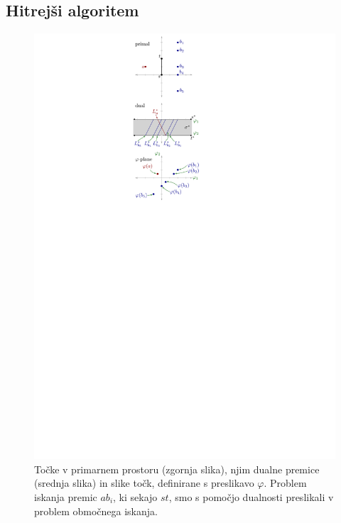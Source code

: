 \documentclass[a4paper, 12pt]{book}
\begin{document}
\subsection{Hitrejši algoritem}
\label{compact}
\begin{figure}
\centerline{\includegraphics[scale=1]{pics/duality-vertical.pdf}}
\caption{Točke v primarnem prostoru (zgornja slika), njim dualne premice (srednja slika) in slike točk, definirane s preslikavo $\varphi$. Problem iskanja premic $ab_i$, ki sekajo $st$, smo s pomočjo dualnosti preslikali v problem območnega iskanja.} 
\label{hslab}
\end{figure}
\end{document}
